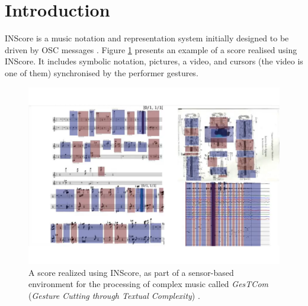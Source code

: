 \documentclass{article}
\title{\papertitle}
\newcommand{\IS}		{INScore}
\begin{document}
%
\capstartfalse
\maketitle
\capstarttrue
%
\begin{abstract}
The presented work is part of the \IS\ project, an environment for the design of augmented interactive music scores, oriented towards unconventional uses of music notation and representation, including real-time symbolic notation capabilities. This environment is fully controllable using Open Sound Control [OSC] messages. \IS\ scripting language is an extended textual version of OSC messages that allows you to design scores in a modular and incremental way. This article presents a major revision of this scripting language, based on the description and manipulation of trees.
\end{abstract}
%

\section{Introduction}\label{sec:introduction}

\IS \cite{Fober:12a} is a music notation and representation system initially designed to be driven by OSC messages \cite{OSC}. Figure \ref{pavlos} presents an example of a score realised using \IS . It includes symbolic notation, pictures, a video, and cursors (the video is one of them) synchronised by the performer gestures.

\begin{figure}
\begin{center}
\includegraphics[width=1.0\columnwidth]{inscore-score}
\caption{A score realized using \IS , as part of a sensor-based environment for the processing of complex music called \emph{GesTCom} (\emph{Gesture Cutting through Textual Complexity}) \cite{antoniadis:tel-01861171}.}
\label{pavlos}
\end{center}
\end{figure}
\end{document}
